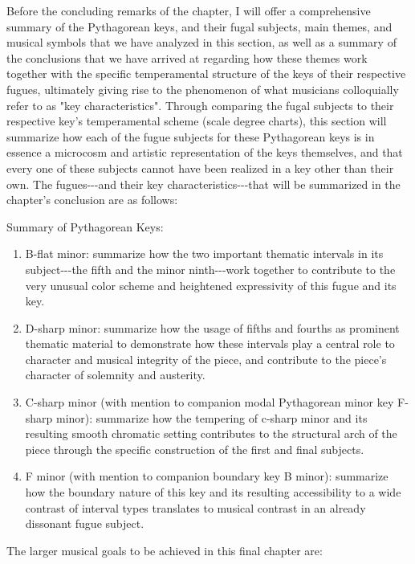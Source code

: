 Before the concluding remarks of the chapter, I will offer a
comprehensive summary of the Pythagorean keys, and their fugal subjects,
main themes, and musical symbols that we have analyzed in this section,
as well as a summary of the conclusions that we have arrived at
regarding how these themes work together with the specific temperamental
structure of the keys of their respective fugues, ultimately giving rise
to the phenomenon of what musicians colloquially refer to as "key
characteristics". Through comparing the fugal subjects to their
respective key's temperamental scheme (scale degree charts), this
section will summarize how each of the fugue subjects for these
Pythagorean keys is in essence a microcosm and artistic representation
of the keys themselves, and that every one of these subjects cannot have
been realized in a key other than their own. The fugues-\/-\/-and their
key characteristics-\/-\/-that will be summarized in the chapter's
conclusion are as follows:

Summary of Pythagorean Keys:

\begin{enumerate}
\def\labelenumi{\arabic{enumi}.}
\tightlist
\item
  B-flat minor: summarize how the two important thematic intervals in
  its subject-\/-\/-the fifth and the minor ninth-\/-\/-work together to
  contribute to the very unusual color scheme and heightened
  expressivity of this fugue and its key.
\item
  D-sharp minor: summarize how the usage of fifths and fourths as
  prominent thematic material to demonstrate how these intervals play a
  central role to character and musical integrity of the piece, and
  contribute to the piece's character of solemnity and austerity.
\item
  C-sharp minor (with mention to companion modal Pythagorean minor key
  F-sharp minor): summarize how the tempering of c-sharp minor and its
  resulting smooth chromatic setting contributes to the structural arch
  of the piece through the specific construction of the first and final
  subjects.
\item
  F minor (with mention to companion boundary key B minor): summarize
  how the boundary nature of this key and its resulting accessibility to
  a wide contrast of interval types translates to musical contrast in an
  already dissonant fugue subject.
\end{enumerate}

The larger musical goals to be achieved in this final chapter are:

